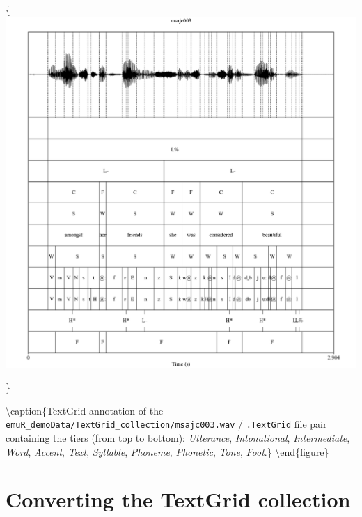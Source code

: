 \documentclass[]{book}
\begin{document}
\{\centering \includegraphics[width=0.85\linewidth]{pics/msajc003_praat}

\}

\textbackslash{}caption\{TextGrid annotation of the \texttt{emuR\_demoData/TextGrid\_collection/msajc003.wav} / \texttt{.TextGrid} file pair containing the tiers (from top to bottom): \emph{Utterance}, \emph{Intonational}, \emph{Intermediate}, \emph{Word}, \emph{Accent}, \emph{Text}, \emph{Syllable}, \emph{Phoneme}, \emph{Phonetic}, \emph{Tone}, \emph{Foot}.\}\label{fig:msajc003-praatTG}
\textbackslash{}end\{figure\}

\hypertarget{converting-the-textgrid-collection}{%
\section{Converting the TextGrid collection}\label{converting-the-textgrid-collection}}
\end{document}

